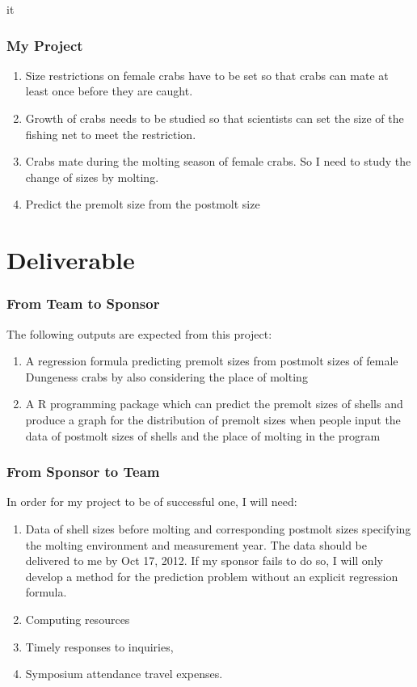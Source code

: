 it\documentclass[compress,handout,10pt]{beamer}
\let\olditem\item
\renewcommand{\item}{\setlength{\itemsep}{0.5\baselineskip}\olditem}
\begin{document}
\begin{frame}
    \frametitle{My Project}
     \begin{enumerate}
         \item Size restrictions on female crabs have to be set so that crabs can mate at least once before they are caught.
         \item Growth of crabs needs to be studied so that scientists can set the size of the fishing net to meet the restriction.
         \item Crabs mate during the molting season of female crabs. So I need to study the change of sizes by molting.
         \item Predict the premolt size from the postmolt size
     \end{enumerate}
\end{frame}

\section{Deliverable}

\begin{frame}
    \frametitle{From Team to Sponsor}
    The following outputs are expected from this project:
     \begin{enumerate}
         \item A regression formula predicting premolt sizes from postmolt sizes of female Dungeness crabs by also considering the place of molting
         \item A R programming package which can predict the premolt sizes of shells and produce a graph for the distribution of premolt sizes when people input the data of postmolt sizes of shells and the place of molting in the program
     \end{enumerate}
\end{frame}

\begin{frame}
    \frametitle{From Sponsor to Team}
    In order for my project to be of successful one, I will need:
     \begin{enumerate}
         \item Data of shell sizes before molting and corresponding postmolt sizes specifying the molting environment and measurement year. The data should be delivered to me by Oct 17, 2012. If my sponsor fails to do so, I will only develop a method for the prediction problem without an explicit regression formula.
         \item Computing resources
         \item Timely responses to inquiries, 
         \item Symposium attendance travel expenses.
     \end{enumerate}
\end{frame}
\end{document}
